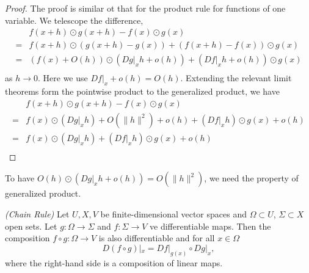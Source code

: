 \documentclass[10pt]{article}
\begin{document}
  \begin{proof}
    The proof is similar ot that for the product rule for functions of one variable.
    We telescope the difference,
    \[
      \begin{aligned}
        &f(x+h) \odot g(x+h) - f(x) \odot g(x)\\
        =& f(x+h) \odot (g(x+h)-g(x)) + (f(x+h)-f(x)) \odot g(x) \\
        =& (f(x)+O(h)) \odot (Dg|_{x}h+o(h)) + (Df|_{x}h + o(h)) \odot g(x)\\
      \end{aligned}
    \]
    as $h \to 0$. Here we use $Df|_{x}+o(h) = O(h)$. Extending the relevant limit theorems form the pointwise 
    product to the generalized product, we have
    \[
      \begin{aligned}
        &f(x+h) \odot g(x+h) - f(x) \odot g(x)\\
        =& f(x) \odot (Dg|_{x}h) + O(\|h\|^{2}) + o(h) + (Df|_{x}h) \odot g(x) + o(h)\\
        =& f(x) \odot (Dg|_{x}h) + (Df|_{x}h) \odot g(x) + o(h)\\
      \end{aligned}
    \]
  \end{proof}

  \begin{remark}
    To have $O(h) \odot (Dg|_{x}h+o(h)) = O(\|h\|^{2})$, we need the property of generalized product.
  \end{remark}

  \begin{theorem}
    \textit{(Chain Rule)}
    Let $U,X,V$ be finite-dimensional vector spaces and $\Omega \subset U$, $\Sigma \subset X$ open sets.
    Let $g : \Omega \to \Sigma$ and $f : \Sigma \to V$ ve differentiable maps.
    Then the composition $f \circ g : \Omega \to V$ is also differentiable and for all $x \in \Omega$
    \begin{equation}
      D(f \circ g)|_{x} = Df|_{g(x)} \circ Dg|_{x},
    \end{equation}
    where the right-hand side is a composition of linear maps.
  \end{theorem}
\end{document}
